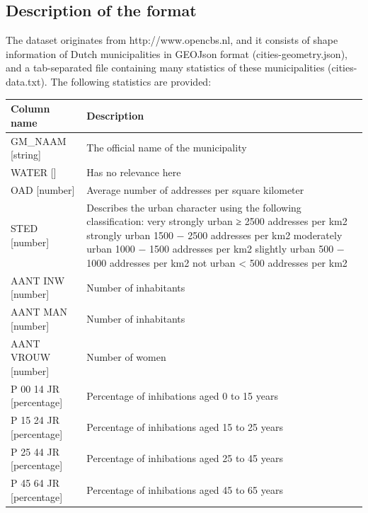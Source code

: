 \documentclass[a4paper,twoside,11pt]{article}
\begin{document}
\subsection{Description of the format}
The dataset originates from http://www.opencbs.nl, and it consists of shape information of Dutch municipalities in GEOJson format (cities-geometry.json), and a
tab-separated file containing many statistics of these municipalities (cities-data.txt). \newline
The following statistics are provided: \newline
\begin{center}
    \begin{tabular}{ | p{4.9cm} | p{10cm} |}
    \hline
    \textbf{Column name} & \textbf{Description} \\ \hline
        GM\_NAAM [string] & The official name of the municipality \\ \hline
        WATER [] & Has no relevance here \\ \hline
        OAD [number] & Average number of addresses per square kilometer \\ \hline
        STED [number] & Describes the urban character using the following classification: \newline
                        1 very strongly urban ≥ 2500 addresses per km2 \newline
                        2 strongly urban 1500 − 2500 addresses per km2 \newline
                        3 moderately urban 1000 − 1500 addresses per km2 \newline
                        4 slightly urban 500 − 1000 addresses per km2 \newline
                        5 not urban < 500 addresses per km2  \\ \hline
        AANT INW [number] & Number of inhabitants \\ \hline
        AANT MAN [number] & Number of inhabitants \\ \hline
        AANT VROUW [number] & Number of women \\ \hline
        P 00 14 JR [percentage] & Percentage of inhibations aged 0 to 15 years \\ \hline
        P 15 24 JR [percentage] & Percentage of inhibations aged 15 to 25 years \\ \hline
        P 25 44 JR [percentage] & Percentage of inhibations aged 25 to 45 years \\ \hline
        P 45 64 JR [percentage] & Percentage of inhibations aged 45 to 65 years \\ \hline
    \end{tabular}
\end{center}
\end{document}
